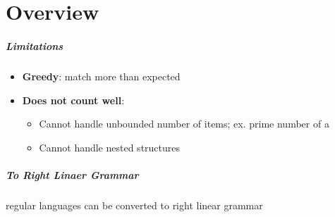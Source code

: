 \chapter{Overview}

\paragraph{Limitations}
\begin{itemize}
  \item \textbf{Greedy}: match more than expected
  \item \textbf{Does not count well}:
  \begin{itemize}
    \item Cannot handle unbounded number of items; ex. prime number of a
    \item Cannot handle nested structures
  \end{itemize}
\end{itemize}

\paragraph{To Right Linaer Grammar} regular languages can be converted to
right linear grammar
